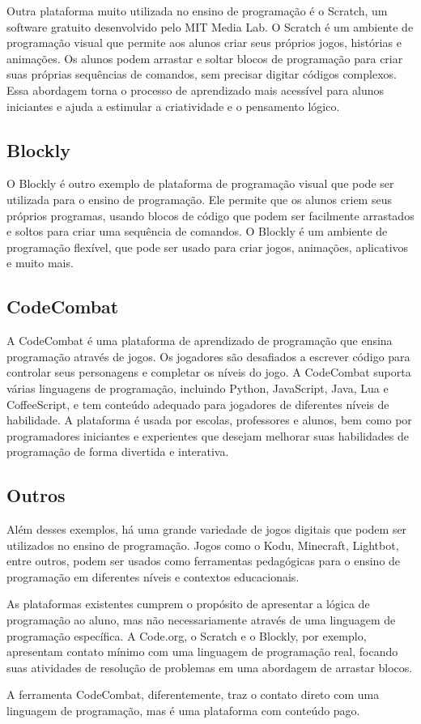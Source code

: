 Outra plataforma muito utilizada no ensino de programação é o Scratch, um software gratuito desenvolvido pelo MIT Media Lab. O Scratch é um ambiente de programação visual que permite aos alunos criar seus próprios jogos, histórias e animações. Os alunos podem arrastar e soltar blocos de programação para criar suas próprias sequências de comandos, sem precisar digitar códigos complexos. Essa abordagem torna o processo de aprendizado mais acessível para alunos iniciantes e ajuda a estimular a criatividade e o pensamento lógico.

\subsection{Blockly}

O Blockly é outro exemplo de plataforma de programação visual que pode ser utilizada para o ensino de programação. Ele permite que os alunos criem seus próprios programas, usando blocos de código que podem ser facilmente arrastados e soltos para criar uma sequência de comandos. O Blockly é um ambiente de programação flexível, que pode ser usado para criar jogos, animações, aplicativos e muito mais.

\subsection{CodeCombat}
A CodeCombat é uma plataforma de aprendizado de programação que ensina programação através de jogos. Os jogadores são desafiados a escrever código para controlar seus personagens e completar os níveis do jogo. A CodeCombat suporta várias linguagens de programação, incluindo Python, JavaScript, Java, Lua e CoffeeScript, e tem conteúdo adequado para jogadores de diferentes níveis de habilidade. A plataforma é usada por escolas, professores e alunos, bem como por programadores iniciantes e experientes que desejam melhorar suas habilidades de programação de forma divertida e interativa.

\subsection{Outros}
Além desses exemplos, há uma grande variedade de jogos digitais que podem ser utilizados no ensino de programação. Jogos como o Kodu, Minecraft, Lightbot, entre outros, podem ser usados como ferramentas pedagógicas para o ensino de programação em diferentes níveis e contextos educacionais.

As plataformas existentes cumprem o propósito de apresentar a lógica de programação ao aluno, mas não necessariamente através de uma linguagem de programação específica. A Code.org, o Scratch e o Blockly, por exemplo, apresentam contato mínimo com uma linguagem de programação real, focando suas atividades de resolução de problemas  em uma abordagem de arrastar blocos.

A ferramenta CodeCombat, diferentemente, traz o contato direto com uma linguagem de programação, mas é uma plataforma com conteúdo pago.